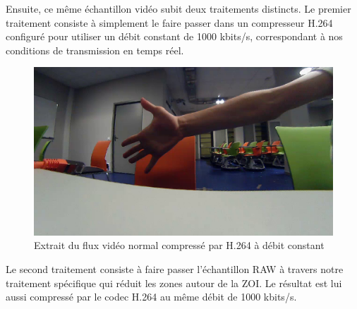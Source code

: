 \documentclass[11pt,a4paper]{article}
\begin{document}
\bigbreak
Ensuite, ce même échantillon vidéo subit deux traitements distincts.
Le premier traitement consiste à simplement le faire passer dans un compresseur H.264 configuré pour utiliser un débit constant de 1000 kbits/s, correspondant à nos conditions de transmission en temps réel.

\begin{figure}[H]
\begin{center}
\includegraphics[scale=0.25]{images/comparaison_flux1.png}
\end{center}
\caption{Extrait du flux vidéo normal compressé par H.264 à débit constant}
\label{}
\end{figure}

\bigbreak
Le second traitement consiste à faire passer l'échantillon RAW à travers notre traitement spécifique qui réduit les zones autour de la ZOI.
Le résultat est lui aussi compressé par le codec H.264 au même débit de 1000 kbits/s.
\end{document}
